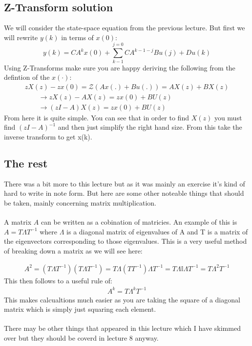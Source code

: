 \documentclass[a4paper,11pt]{article}
\begin{document}
\subsection{Z-Transform solution}
We will consider the state-space equation from the previous lecture. But first we will rewrite $y(k)$ in terms of $x(0)$:
\begin{equation}
    y(k) = CA^kx(0)+\sum\limits_{k-1}^{j=0}CA^{k-1-j}Bu(j) + Du(k)  
\end{equation}
Using Z-Transforms make sure you are happy deriving the following from the defintion of the $x(\cdot)$:
\begin{gather}
	zX(z) - zx(0) = \mathcal{Z}(Ax(.)+Bu(.))= AX(z)+BX(z)\\
	\qquad \rightarrow zX(z)-AX(z)=zx(0)+BU(z)\\
	\qquad \rightarrow (zI - A)X(z)= zx(0)+BU(z)
\end{gather}
From here it is quite simple. You can see that in order to find $X(z)$ you must find $(zI-A)^{-1}$ and then just simplify the right hand size. From this take the inverse transform to get x(k).
\subsection{The rest}
	There was a bit more to this lecture but as it was mainly an exercise it's kind of hard to write in note form. But here are some other noteable things that should be taken, mainly concerning matrix multiplication.\\\\
	A matrix $A$ can be written as a cobination of matricies. An example of this is $A=T\Lambda T^{-1}$ where $\Lambda$ is a diagonal matrix of eigenvalues of A and T is a matrix of the eigenvectors corresponding to those eigenvalues. This is a very useful method of breaking down a matrix as we will see here: 

	\begin{gather}
		A^2=(T\Lambda T^{-1})(T\Lambda T^{-1})=T\Lambda (TT^{-1})\Lambda T^{-1}=T\Lambda \mathbb{I}\Lambda T^{-1} = T\Lambda^2T^{-1}
	\end{gather}
	This then follows to a useful rule of:
	\begin{gather}
		A^k=T\Lambda^kT^{-1}
	\end{gather}
	This makes calcualtions much easier as you are taking the square of a diagonal matrix which is simply just squaring each element.\\\\
	There may be other things that appeared in this lecture which I have skimmed over but they should be coverd in lecture 8 anyway.
\end{document}
